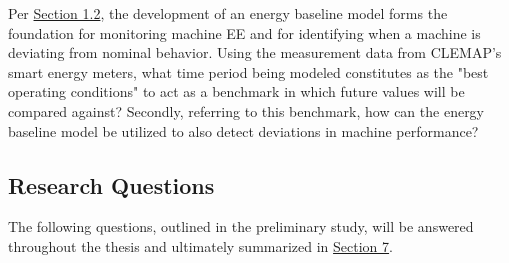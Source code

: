 Per \hyperlink{subsection.1.2}{Section 1.2}, the development of an energy baseline model forms the foundation for monitoring machine EE and for identifying when a machine is deviating from nominal behavior. Using the measurement data from CLEMAP's smart energy meters, what time period being modeled constitutes as the "best operating conditions" to act as a benchmark in which future values will be compared against? Secondly, referring to this benchmark, how can the energy baseline model be utilized to also detect deviations in machine performance?

\subsection{Research Questions}

The following questions, outlined in the preliminary study, will be answered throughout the thesis and ultimately summarized in \hyperlink{section.7}{Section 7}. 


